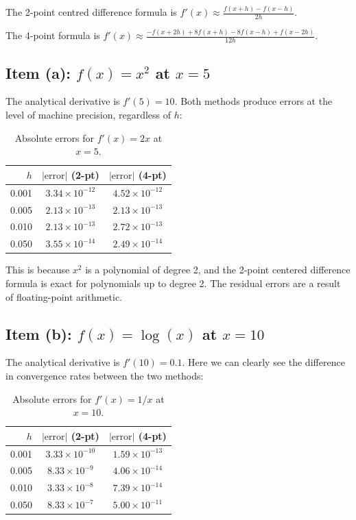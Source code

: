 \documentclass{article}
\begin{document}
The 2-point centred difference formula is $f'(x) \approx \frac{f(x+h) - f(x-h)}{2h}$. 

The 4-point formula is $f'(x) \approx \frac{-f(x+2h) + 8f(x+h) - 8f(x-h) + f(x-2h)}{12h}$.

\subsection*{Item (a): $f(x) = x^2$ at $x = 5$}

The analytical derivative is $f'(5) = 10$. Both methods produce errors at the level of machine precision, regardless of $h$:

\begin{table}[h!]
\centering
\begin{tabular}{rcc}
    \toprule
    $h$ & $|\text{error}|$ (2-pt) & $|\text{error}|$ (4-pt) \\
    \midrule
    0.001 & $3.34 \times 10^{-12}$ & $4.52 \times 10^{-12}$ \\
    0.005 & $2.13 \times 10^{-13}$ & $2.13 \times 10^{-13}$ \\
    0.010 & $2.13 \times 10^{-13}$ & $2.72 \times 10^{-13}$ \\
    0.050 & $3.55 \times 10^{-14}$ & $2.49 \times 10^{-14}$ \\
    \bottomrule
\end{tabular}
\caption{Absolute errors for $f'(x) = 2x$ at $x=5$.}
\label{tab:q5_x2}
\end{table}

This is because $x^2$ is a polynomial of degree 2, and the 2-point centered difference formula is exact for polynomials up to degree 2. The residual errors are a result of floating-point arithmetic.

\subsection*{Item (b): $f(x) = \log(x)$ at $x = 10$}

The analytical derivative is $f'(10) = 0.1$. Here we can clearly see the difference in convergence rates between the two methods:

\begin{table}[h!]
\centering
\begin{tabular}{rcc}
    \toprule
    $h$ & $|\text{error}|$ (2-pt) & $|\text{error}|$ (4-pt) \\
    \midrule
    0.001 & $3.33 \times 10^{-10}$ & $1.59 \times 10^{-13}$ \\
    0.005 & $8.33 \times 10^{-9}$  & $4.06 \times 10^{-14}$ \\
    0.010 & $3.33 \times 10^{-8}$  & $7.39 \times 10^{-14}$ \\
    0.050 & $8.33 \times 10^{-7}$  & $5.00 \times 10^{-11}$ \\
    \bottomrule
\end{tabular}
\caption{Absolute errors for $f'(x) = 1/x$ at $x=10$.}
\label{tab:q5_log}
\end{table}
\end{document}
